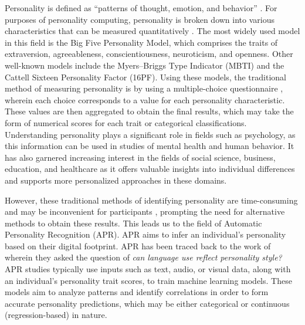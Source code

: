 
Personality is defined as “patterns of thought, emotion, and behavior” \citep{Vinciarelli2014}. For purposes of personality computing, personality is broken down into various characteristics that can be measured quantitatively \citep{Vinciarelli2014}. The most widely used model in this field is the Big Five Personality Model, which comprises the traits of extraversion, agreeableness, conscientiousness, neuroticism, and openness. Other well-known models include the Myers–Briggs Type Indicator (MBTI) and the Cattell Sixteen Personality Factor (16PF). Using these models, the traditional method of measuring personality is by using a multiple-choice questionnaire \citep{farnadi2018}, wherein each choice corresponds to a value for each personality characteristic. These values are then aggregated to obtain the final results, which may take the form of numerical scores for each trait or categorical classifications. Understanding personality plays a significant role in fields such as psychology, as this information can be used in studies of mental health and human behavior. It has also garnered increasing interest in the fields of social science, business, education, and healthcare \citep{Miller2014} as it offers valuable insights into individual differences and supports more personalized approaches in these domains.

However, these traditional methods of identifying personality are time-consuming and may be inconvenient for participants \citep{chen2016}, prompting the need for alternative methods to obtain these results. This leads us to the field of Automatic Personality Recognition (APR). APR aims to infer an individual’s personality based on their digital footprint. APR has been traced back to the work of \citet{Pennebaker1999} wherein they asked the question of \textit{can language use reflect personality style?} APR studies typically use inputs such as text, audio, or visual data, along with an individual’s personality trait scores, to train machine learning models. These models aim to analyze patterns and identify correlations in order to form accurate personality predictions, which may be either categorical or continuous (regression-based) in nature.



